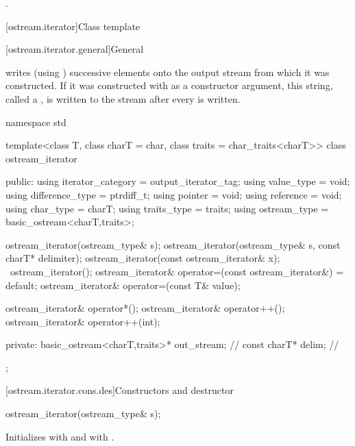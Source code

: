 \begin{itemdescr}
\pnum
\returns
{}.
\end{itemdescr}

[ostream.iterator]{Class template }

[ostream.iterator.general]{General}

\pnum
{}%
writes (using
)
successive elements onto the output stream from which it was constructed.
If it was constructed with
as a constructor argument, this string, called a
,
is written to the stream after every
is written.

\begin{codeblock}
namespace std {
  template<class T, class charT = char, class traits = char_traits<charT>>
  class ostream_iterator {
  public:
    using iterator_category = output_iterator_tag;
    using value_type        = void;
    using difference_type   = ptrdiff_t;
    using pointer           = void;
    using reference         = void;
    using char_type         = charT;
    using traits_type       = traits;
    using ostream_type      = basic_ostream<charT,traits>;

    ostream_iterator(ostream_type& s);
    ostream_iterator(ostream_type& s, const charT* delimiter);
    ostream_iterator(const ostream_iterator& x);
    ~ostream_iterator();
    ostream_iterator& operator=(const ostream_iterator&) = default;
    ostream_iterator& operator=(const T& value);

    ostream_iterator& operator*();
    ostream_iterator& operator++();
    ostream_iterator& operator++(int);

  private:
    basic_ostream<charT,traits>* out_stream;            // \expos
    const charT* delim;                                 // \expos
  };
}
\end{codeblock}

[ostream.iterator.cons.des]{Constructors and destructor}

%
\begin{itemdecl}
ostream_iterator(ostream_type& s);
\end{itemdecl}

\begin{itemdescr}
\pnum
\effects
Initializes  with  and
 with .
\end{itemdescr}


